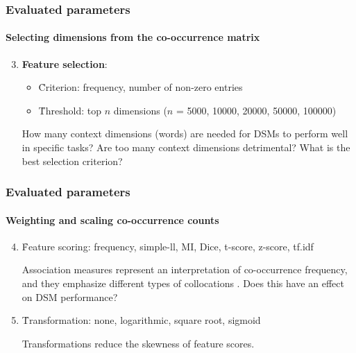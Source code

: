 \documentclass[t]{beamer} %
\begin{document}
\begin{frame}
  \frametitle{Evaluated parameters}
  \framesubtitle{Selecting dimensions from the co-occurrence matrix} 
  \begin{enumerate}
    \setcounter{enumi}{2} 
  \item \textbf{Feature selection}: 
    \begin{itemize}
    \item   \h{Criterion}: frequency, number of non-zero entries 
    \item   \h{Threshold}: top $n$ dimensions ($n$ = 5000, 10000, 20000, 50000, 100000)
    \end{itemize}          
    \begin{block}{}\small
      How many context dimensions (words) are needed for DSMs to perform well in specific tasks? Are too many context dimensions detrimental? What is the best selection criterion? 
    \end{block}   
  \end{enumerate}   
\end{frame}


\begin{frame}
  \frametitle{Evaluated parameters}
  \framesubtitle{Weighting and scaling co-occurrence counts} 
  
  \begin{enumerate}
    \setcounter{enumi}{3}
    
  \item   \h{Feature scoring}: frequency, simple-ll, MI, Dice, t-score, z-score, tf.idf
    \begin{block}{}\small
      Association measures represent an interpretation of co-occurrence frequency, and they emphasize different types of collocations \citep{Evert:08}. Does this have an effect on DSM performance? 
    \end{block}
    
  \item  \h{Transformation}: none, logarithmic, square root, sigmoid
    \begin{block}{}\small
      Transformations reduce the skewness of feature scores.
    \end{block}
  \end{enumerate}   
\end{frame}
\end{document}
